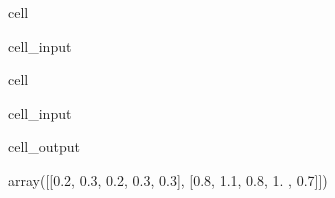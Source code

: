 \documentclass[letterpaper,10pt,english]{jupyterBook}
\begin{document}
\begin{sphinxuseclass}{cell}\begin{sphinxVerbatimInput}

\begin{sphinxuseclass}{cell_input}
\begin{sphinxVerbatim}[commandchars=\\\{\}]
  
  
\end{sphinxVerbatim}

\end{sphinxuseclass}\end{sphinxVerbatimInput}

\end{sphinxuseclass}
\begin{sphinxuseclass}{cell}\begin{sphinxVerbatimInput}

\begin{sphinxuseclass}{cell_input}
\begin{sphinxVerbatim}[commandchars=\\\{\}]
\end{sphinxVerbatim}

\end{sphinxuseclass}\end{sphinxVerbatimInput}
\begin{sphinxVerbatimOutput}

\begin{sphinxuseclass}{cell_output}
\begin{sphinxVerbatim}[commandchars=\\\{\}]
array([[0.2, 0.3, 0.2, 0.3, 0.3],
       [0.8, 1.1, 0.8, 1. , 0.7]])
\end{sphinxVerbatim}

\end{sphinxuseclass}\end{sphinxVerbatimOutput}

\end{sphinxuseclass}
\end{document}
